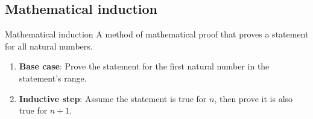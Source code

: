 \subsection{Mathematical induction}

\begin{definition}
    {Mathematical induction}
    A method of mathematical proof that proves a statement for all natural numbers.
    \begin{enumerate}
        \item \textbf{Base case}: Prove the statement for the first natural number in the statement's range.
        \item \textbf{Inductive step}: Assume the statement is true for $n$, then prove it is also true for $n+1$.
    \end{enumerate}
\end{definition}